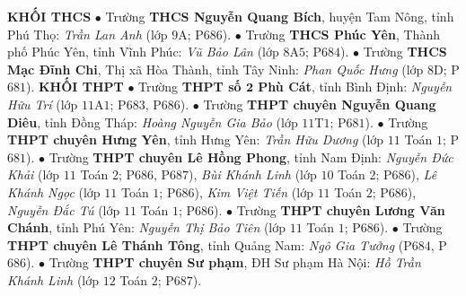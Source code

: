\begin{multicols}{2}
	\textbf{\color{toancuabi}KHỐI THCS}
	\vskip 0.05cm
	$\bullet$  Trường \textbf{\color{toancuabi}THCS Nguyễn Quang Bích}, huyện Tam Nông, tỉnh Phú Thọ: \textit{Trần Lan Anh} (lớp $9$A; P$686$).
	\vskip 0.05cm
	$\bullet$  Trường \textbf{\color{toancuabi}THCS Phúc Yên}, Thành phố Phúc Yên, tỉnh Vĩnh Phúc: \textit{Vũ Bảo Lân} (lớp $8$A$5$; P$684$).
	\vskip 0.05cm
	$\bullet$  Trường \textbf{\color{toancuabi}THCS Mạc Đĩnh Chi}, Thị xã Hòa Thành, tỉnh Tây Ninh: \textit{Phan Quốc Hưng} (lớp $8$D; P$681$).
	\vskip 0.05cm
	\textbf{\color{toancuabi}KHỐI THPT}
	\vskip 0.05cm
	$\bullet$  Trường \textbf{\color{toancuabi}THPT số $\pmb{2}$ Phù Cát}, tỉnh Bình Định: \textit{Nguyễn Hữu Trí} (lớp $11$A$1$; P$683$, P$686$).
	\vskip 0.05cm
	$\bullet$  Trường \textbf{\color{toancuabi}THPT chuyên Nguyễn Quang Diêu}, tỉnh Đồng Tháp: \textit{Hoàng Nguyễn Gia Bảo} (lớp $11$T$1$; P$681$).
	\vskip 0.05cm
	$\bullet$  Trường \textbf{\color{toancuabi}THPT chuyên Hưng Yên}, tỉnh Hưng Yên: \textit{Trần Hữu Dương} (lớp $11$ Toán $1$; P$681$).
	\vskip 0.05cm
	$\bullet$  Trường \textbf{\color{toancuabi}THPT chuyên Lê Hồng Phong}, tỉnh Nam Định: \textit{Nguyễn Đức Khải} (lớp $11$ Toán $2$; P$686$, P$687$), \textit{Bùi Khánh Linh} (lớp $10$ Toán $2$; P$686$), \textit{Lê Khánh Ngọc} (lớp $11$ Toán $1$; P$686$), \textit{Kim Việt Tiến} (lớp $11$ Toán $2$; P$686$), \textit{Nguyễn Đắc Tú} (lớp $11$ Toán $1$; P$686$).
	\vskip 0.05cm
	$\bullet$  Trường \textbf{\color{toancuabi}THPT chuyên Lương Văn Chánh}, tỉnh Phú Yên: \textit{Nguyễn Thị Bảo Tiên} (lớp $11$ Toán $1$; P$686$).
	\vskip 0.05cm
	$\bullet$  Trường \textbf{\color{toancuabi}THPT chuyên Lê Thánh Tông}, tỉnh Quảng Nam: \textit{Ngô Gia Tưởng} (P$684$, P$686$).
	\vskip 0.05cm
	$\bullet$  Trường \textbf{\color{toancuabi}THPT chuyên Sư phạm}, ĐH Sư phạm Hà Nội: \textit{Hồ Trần Khánh Linh} (lớp $12$ Toán $2$; P$687$).
\end{multicols}